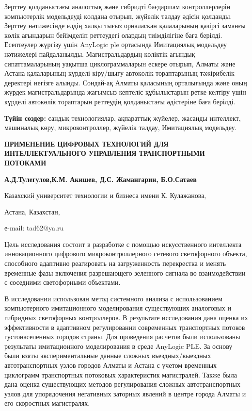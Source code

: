 Зерттеу қолданыстағы аналогтық және гибридті бағдаршам контроллерлерін
компьютерлік модельдеуді қолдана отырып, жүйелік талдау әдісін қолданды.
Зерттеу нәтижесінде елдің халқы тығыз орналасқан қалаларының қазіргі
заманғы көлік ағындарын бейімделіп реттеудегі олардың тиімділігіне баға
берілді. Есептеулер жүргізу үшін AnyLogic ple ортасында Имитациялық
модельдеу нәтижелері пайдаланылды. Магистральдардың көліктік ағындық
сипаттамаларының уақытша циклограммаларын ескере отырып, Алматы және
Астана қалаларының күрделі кіру/шығу автокөлік тораптарының тәжірибелік
деректері негізге алынды. Сондай-ақ Алматы қаласының орталығында және
оның жүрдек магистральдарында жағымсыз кептеліс құбылыстарын ретке
келтіру үшін күрделі автокөлік тораптарын реттеудің қолданыстағы
әдістеріне баға берілді.

\textbf{Түйін сөздер:} сандық технологиялар, ақпараттық жүйелер, жасанды
интеллект, машиналық көру, микроконтроллер, жүйелік талдау, Имитациялық
модельдеу.

\textbf{ПРИМЕНЕНИЕ ЦИФРОВЫХ ТЕХНОЛОГИЙ ДЛЯ ИНТЕЛЛЕКТУАЛЬНОГО УПРАВЛЕНИЯ
ТРАНСПОРТНЫМИ ПОТОКАМИ}

\textbf{А.Д.Тулегулов,К.М. Акишев, Д.С. Жамангарин, Б.О.Сатаев}

Казахский университет технологии и бизнеса имени К. Кулажанова,

Астана, Казахстан,

е-mail: tad62@ya.ru

Цель исследования состоит в разработке с помощью искусственного
интеллекта инновационного цифрового микроконтроллерного сетевого
светофорного объекта, способного адаптивно реагировать на загруженность
перекрестка и менять временные фазы включения разрешающего зеленного
сигнала во взаимодействии с соседними светофорными объектами.

В исследовании использован метод системного анализа с использованием
компьютерного имитационного моделирования существующих аналоговых и
гибридных светофорных контроллеров. В результате исследования дана
оценка их эффективности в адаптивном регулировании современных
транспортных потоков густонаселенных городов страны. Для проведения
расчетов были использованы результаты имитационного моделирования в
среде AnyLogic PLE. За основу были взяты экспериментальные данные
сложных въездных/выездных автотранспортных узлов городов Алматы и Астана
с учетом временных циклограмм транспортных потоковых характеристик
магистралей. Также была дана оценка существующих методов регулирования
сложных автотранспортных узлов для упорядочения негативных заторных
явлений в центре города Алматы и его скоростных магистралях.


